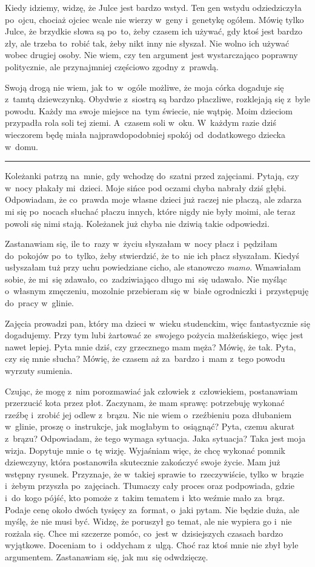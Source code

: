 \documentclass[9pt, a5paper]{memoir}
\begin{document}
Kiedy idziemy, widzę, że Julce jest bardzo wstyd. Ten gen wstydu odziedziczyła po~ojcu, chociaż ojciec wcale nie wierzy w~geny i~genetykę ogółem. Mówię tylko Julce, że brzydkie słowa są po~to, żeby czasem ich używać, gdy ktoś jest bardzo zły, ale trzeba to~robić tak, żeby nikt inny nie słyszał. Nie wolno ich używać wobec drugiej osoby. Nie wiem, czy ten argument jest wystarczająco poprawny politycznie, ale przynajmniej częściowo zgodny z~prawdą.

Swoją drogą nie wiem, jak to~w~ogóle możliwe, że moja córka dogaduje się z~tamtą dziewczynką. Obydwie z~siostrą są bardzo płaczliwe, rozklejają się z~byle powodu. Każdy ma swoje miejsce na~tym świecie, nie wątpię. Moim dzieciom przypadła rola soli tej ziemi. A~czasem soli w~oku. W~każdym razie dziś wieczorem będę miała najprawdopodobniej spokój od~dodatkowego dziecka w~domu.

\fancybreak{* \quad * \quad *}

Koleżanki patrzą na~mnie, gdy wchodzę do~szatni przed zajęciami. Pytają, czy w~nocy płakały mi~dzieci. Moje sińce pod oczami chyba nabrały dziś głębi. Odpowiadam, że co~prawda moje własne dzieci już raczej nie płaczą, ale zdarza mi się po~nocach słuchać płaczu innych, które nigdy nie były moimi, ale teraz powoli się nimi stają. Koleżanek już chyba nie dziwią takie odpowiedzi.

Zastanawiam się, ile to~razy w~życiu słyszałam w~nocy płacz i~pędziłam do~pokojów po~to~tylko, żeby stwierdzić, że to~nie ich płacz słyszałam. Kiedyś usłyszałam tuż przy uchu powiedziane cicho, ale stanowczo \textit{mamo}. Wmawiałam sobie, że mi~się zdawało, co~zadziwiająco długo mi~się udawało. Nie myśląc o~własnym zmęczeniu, mozolnie przebieram się w~białe ogrodniczki i~przystępuję do~pracy w~glinie.

Zajęcia prowadzi pan, który ma dzieci w~wieku studenckim, więc fantastycznie się dogadujemy. Przy tym lubi żartować ze~swojego pożycia małżeńskiego, więc jest nawet lepiej. Pyta mnie dziś, czy grzecznego mam męża? Mówię, że tak. Pyta, czy się mnie słucha? Mówię, że czasem aż za~bardzo i~mam z~tego powodu wyrzuty sumienia.

Czując, że mogę z~nim porozmawiać jak człowiek z~człowiekiem, postanawiam przerzucić kota przez płot. Zaczynam, że mam sprawę: potrzebuję wykonać rzeźbę i~zrobić jej odlew z~brązu. Nic nie wiem o~rzeźbieniu poza dłubaniem w~glinie, proszę o~instrukcje, jak mogłabym to~osiągnąć? Pyta, czemu akurat z~brązu? Odpowiadam, że tego wymaga sytuacja. Jaka sytuacja? Taka jest moja wizja. Dopytuje mnie o~tę wizję. Wyjaśniam więc, że chcę wykonać pomnik dziewczyny, która postanowiła skutecznie zakończyć swoje życie. Mam już wstępny rysunek. Przyznaje, że w~takiej sprawie to~rzeczywiście, tylko w~brązie i~żebym przyszła po~zajęciach. Tłumaczy cały proces oraz podpowiada, gdzie i~do~kogo pójść, kto pomoże z~takim tematem i~kto weźmie mało za~brąz. Podaje cenę około dwóch tysięcy za~format, o~jaki pytam. Nie będzie duża, ale myślę, że nie musi być. Widzę, że poruszył go temat, ale nie wypiera go i~nie rozżala się. Chce mi szczerze pomóc, co~jest w~dzisiejszych czasach bardzo wyjątkowe. Doceniam to~i~oddycham z~ulgą. Choć raz ktoś mnie nie zbył byle argumentem. Zastanawiam się, jak mu~się odwdzięczę.
\end{document}
